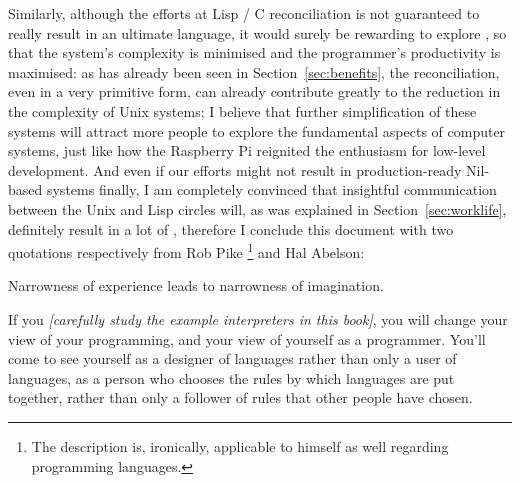 Similarly, although the efforts at Lisp / C reconciliation is not guaranteed
to really result in an ultimate language, it would surely be rewarding to
explore , so that the
system's complexity is minimised and the programmer's productivity is maximised:
as has already been seen in Section~\ref{sec:benefits}, the reconciliation, even
in a very primitive form, can already contribute greatly to the reduction in the
complexity of Unix systems; I believe that further simplification of these
systems will attract more people to explore the fundamental aspects of computer
systems, just like how the Raspberry Pi reignited the enthusiasm for low-level
development.  And even if our efforts might not result in production-ready
Nil-based systems finally, I am completely convinced that insightful
communication between the Unix and Lisp circles will, as was explained in
Section~\ref{sec:worklife}, definitely result in a lot of , therefore I conclude this document
with two quotations respectively from Rob Pike%
\footnote{The description is, ironically, applicable to himself as well
regarding programming languages.} and Hal Abelson:
\begin{quoting}
	Narrowness of experience leads to narrowness of imagination.
\end{quoting}
\colskipc
\begin{quoting}
	If you \emph{[carefully study the example interpreters in this book]},
	you will change your view of your programming, and your view of
	yourself as a programmer.  You'll come to see yourself as a designer
	of languages rather than only a user of languages, as a person
	who chooses the rules by which languages are put together, rather
	than only a follower of rules that other people have chosen.
\end{quoting}

